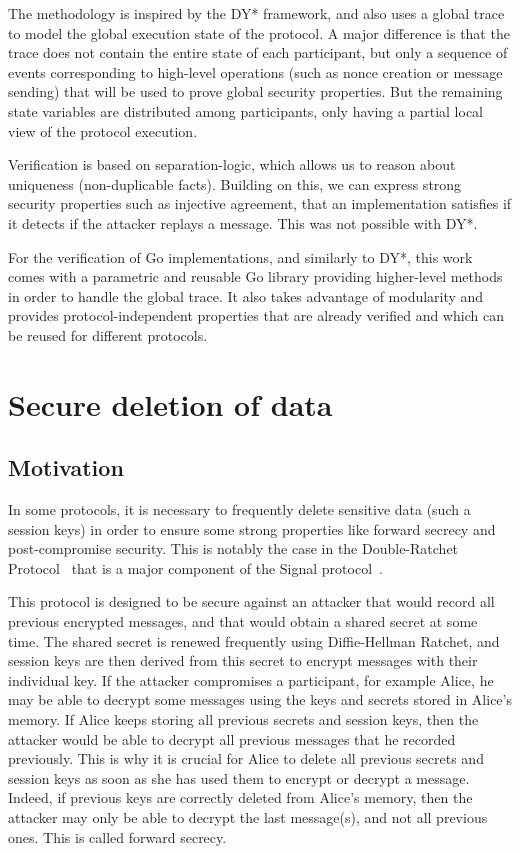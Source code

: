 \documentclass{article}
\begin{document}
The methodology is inspired by the DY* framework, and also uses a global trace to model the global execution state of the protocol. A major difference is that the trace does not contain the entire state of each participant, but only a sequence of events corresponding to high-level operations (such as nonce creation or message sending) that will be used to prove global security properties. But the remaining state variables are distributed among participants, only having a partial local view of the protocol execution. 

Verification is based on separation-logic, which allows us to reason about uniqueness (non-duplicable facts). Building on this, we can express strong security properties such as injective agreement, that an implementation satisfies if it detects if the attacker replays a message. This was not possible with DY*.

For the verification of Go implementations, and similarly to DY*, this work comes with a parametric and reusable Go library providing higher-level methods in order to handle the global trace. It also takes advantage of modularity and provides protocol-independent properties that are already verified and which can be reused for different protocols.

\section{Secure deletion of data}
\subsection{Motivation}
\label{sec:motivation}

In some protocols, it is necessary to frequently delete sensitive data (such a session keys) in order to ensure some strong properties like forward secrecy and post-compromise security. This is notably the case in the Double-Ratchet Protocol~\cite{perrin2016double} that is a major component of the Signal protocol~\cite{marlinspike2016x3dh}. 

This protocol is designed to be secure against an attacker that would record all previous encrypted messages, and that would obtain a shared secret at some time. The shared secret is renewed frequently using Diffie-Hellman Ratchet, and session keys are then derived from this secret to encrypt messages with their individual key. If the attacker compromises a participant, for example Alice, he may be able to decrypt some messages using the keys and secrets stored in Alice's memory. If Alice keeps storing all previous secrets and session keys, then the attacker would be able to decrypt all previous messages that he recorded previously. This is why it is crucial for Alice to delete all previous secrets and session keys as soon as she has used them to encrypt or decrypt a message.
Indeed, if previous keys are correctly deleted from Alice's memory, then the attacker may only be able to decrypt the last message(s), and not all previous ones. This is called forward secrecy.
\end{document}
